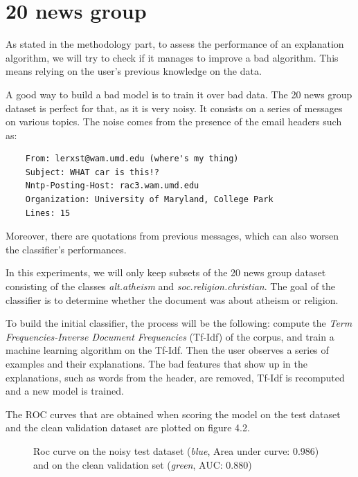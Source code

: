 \documentclass[a4paper,11pt]{kth-mag}
\begin{document}
\section{20 news group}

As stated in the methodology part, to assess the performance of an explanation algorithm, we will try to check if it manages to improve a bad algorithm. This means relying on the user's previous knowledge on the data.

A good way to build a bad model is to train it over bad data. The 20 news group dataset is perfect for that, as it is very noisy. It consists on a series of messages on various topics. The noise comes from the presence of the email headers such as:

\footnotesize
\begin{verbatim}
	From: lerxst@wam.umd.edu (where's my thing)
	Subject: WHAT car is this!?
	Nntp-Posting-Host: rac3.wam.umd.edu
	Organization: University of Maryland, College Park
	Lines: 15
\end{verbatim}
\normalsize

Moreover, there are quotations from previous messages, which can also worsen the classifier's performances.

In this experiments, we will only keep subsets of the 20 news group dataset consisting of the classes \textit{alt.atheism} and \textit{soc.religion.christian}. The goal of the classifier is to determine whether the document was about atheism or religion.

To build the initial classifier, the process will be the following: compute the \textit{Term Frequencies-Inverse Document Frequencies} (Tf-Idf) of the corpus, and train a machine learning algorithm on the Tf-Idf. Then the user observes a series of examples and their explanations. The bad features that show up in the explanations, such as words from the header, are removed, Tf-Idf is recomputed and a new model is trained.

The ROC curves that are obtained when scoring the model on the test dataset and the clean validation dataset are plotted on figure 4.2.

\begin{figure}[h]
		\centering
    	\def\svgwidth{\columnwidth}
    	\resizebox{0.75\textwidth}{!}{}
    	\caption{Roc curve on the noisy test dataset (\textit{blue}, Area under curve: 0.986) and on the clean validation set (\textit{green}, AUC: 0.880)}
\end{figure}
\end{document}
